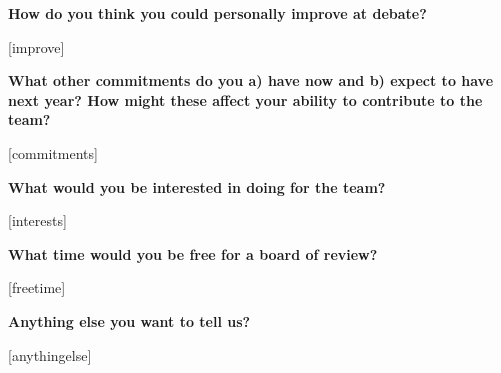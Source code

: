 \documentclass[11pt]{article}
\newcommand{\improve}{[improve]}
\newcommand{\commitments}{[commitments]}
\newcommand{\interests}{[interests]}
\newcommand{\freetime}{[freetime]}
\newcommand{\anythingelse}{[anythingelse]}
\begin{document}
\begin{samepage}\vspace{8pt}
\begin{flushleft}
\textbf{How do you think you could personally improve at debate?}
\end{flushleft}
\vspace{5pt}

\improve

\end{samepage}


\begin{samepage}\vspace{8pt}
\begin{flushleft}
\textbf{What other commitments do you a) have now and b) expect to have next year? How might these affect your ability to contribute to the team?}
\end{flushleft}
\vspace{5pt}

\commitments

\end{samepage}


\begin{samepage}\vspace{8pt}
\begin{flushleft}
\textbf{What would you be interested in doing for the team?}
\end{flushleft}
\vspace{5pt}

\interests

\end{samepage}


\begin{samepage}\vspace{8pt}
\begin{flushleft}
\textbf{What time would you be free for a board of review?}
\end{flushleft}
\vspace{5pt}

\freetime

\end{samepage}


\begin{samepage}\vspace{8pt}
\begin{flushleft}
\textbf{Anything else you want to tell us?}
\end{flushleft}
\vspace{5pt}

\anythingelse

\end{samepage}
\end{document}
